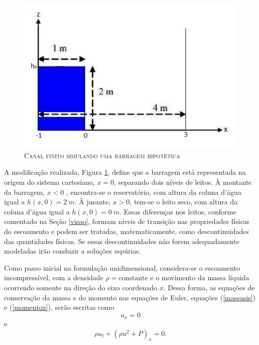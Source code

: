 \begin{figure}[H]
	\centering
	\includegraphics[scale=1]{figuras/tanque2.jpg}
	\caption{\textsc{Canal finito simulando uma barragem hipotética}}
	\vspace{-0.1cm}
	\label{tanque2}
\end{figure}

A modificação realizada, Figura \ref{tanque2}, define que a barragem está representada na origem do sistema cartesiano, $x=0$, separando dois níveis de leitos. À montante da barragem, $x<0$ , encontra-se o reservatório, com altura da coluna d'água igual a $h(x,0)=2 \ m$. À jusante, $x>0$, tem-se o leito seco, com altura da coluna d'água igual a $h(x,0)=0 \ m$. Essas diferenças nos leitos, conforme comentado na Seção \ref{visao}, formam níveis de transição nas propriedades físicas do escoamento e podem ser tratadas, matematicamente, como descontinuidades das quantidades físicas. Se essas descontinuidades não forem adequadamente modeladas irão conduzir a soluções espúrias.

Como passo inicial na formulação unidimensional, considera-se o escoamento incompressível, com a densidade $\rho = \text{constante}$ e o movimento da massa líquida ocorrendo somente na direção do eixo coordenado $x$. Dessa forma, as equações de conservação da massa e do momento nas equações de Euler, equações (\ref{massasis}) e (\ref{momentox}), serão escritas como
\begin{equation}\label{UIncomp}
u_x=0
\end{equation}
e 
\begin{equation} \label{momenIncomp}
\rho u_t + (\rho u^2 + P)_x = 0.
\end{equation}

